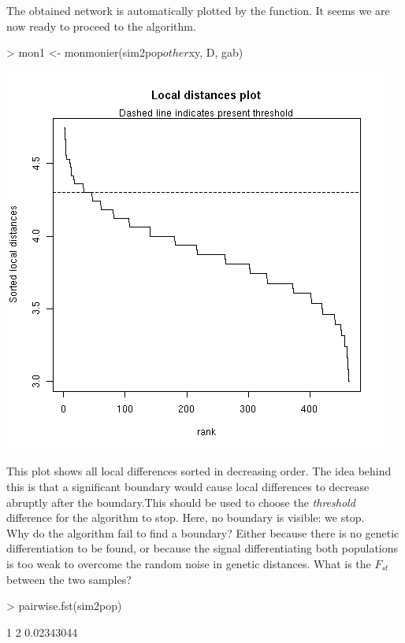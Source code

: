 \documentclass{article}
\begin{document}
\noindent The obtained network is automatically plotted by the function.
It seems we are now ready to proceed to the algorithm.
\begin{Schunk}
\begin{Sinput}
> mon1 <- monmonier(sim2pop$other$xy, D, gab)
\end{Sinput}
\end{Schunk}
\begin{center}
\includegraphics[width=.5\textwidth]{figs/monthres1.png}
\end{center}

\noindent This plot shows all local differences sorted in decreasing order.
The idea behind this is that a significant boundary would cause local differences to decrease abruptly after the boundary.This should be used to choose the \emph{threshold} difference for the algorithm to stop.
Here, no boundary is visible: we stop.
\\

Why do the algorithm fail to find a boundary?
Either because there is no genetic differentiation to be found, or because the signal differentiating both populations is too weak to overcome the random noise in genetic distances.
What is the $F_{st}$ between the two samples?
\begin{Schunk}
\begin{Sinput}
> pairwise.fst(sim2pop)
\end{Sinput}
\begin{Soutput}
           1
2 0.02343044
\end{Soutput}
\end{Schunk}
\end{document}
